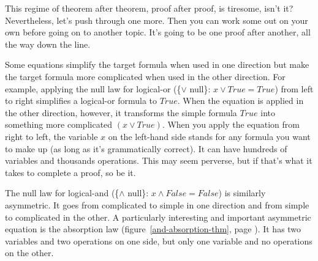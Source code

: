 This regime of theorem after theorem, proof after proof, is tiresome, isn't it?
Nevertheless, let's push through one more.
Then you can work some out on your own before going on to another topic.
It's going to be one proof after another, all the way down the line.

Some equations simplify the target formula when used in one direction
but make the target formula more complicated when used in the other direction.
For example, applying
the null law for logical-or (\{$\vee$ null\}: $x \vee True = True$)
from left to right simplifies a logical-or formula to $True$.
When the equation is applied in the other direction, however,
it transforms the simple formula $True$ into something more complicated $(x \vee True)$.
When you apply the equation from right to left,
the variable $x$ on the left-hand side
stands for any formula you want to make up (as long as it's grammatically correct).
It can have hundreds of variables and thousands operations.
This may seem perverse, but if that's what it takes to complete a proof, so be it.

The null law for logical-and (\{$\wedge$ null\}: $x \wedge False = False$)
is similarly asymmetric.
It goes from complicated to simple in one direction
and from simple to complicated in the other.
A particularly interesting and important asymmetric equation
is the absorption law
(figure~\ref{and-absorption-thm}, page \pageref{and-absorption-thm}).
It has two variables and two operations on one side, but only one variable and no operations on the other.

